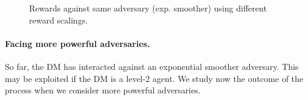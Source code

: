  \begin{figure}%
 \centering
 \caption{Rewards against same adversary (exp. smoother) using different reward scalings.}\label{fig:4C_rs}
 \end{figure}

\paragraph{Facing more powerful adversaries.}

So far, the DM has interacted against an exponential smoother
adversary. This may be exploited if the DM is a level-2 agent.
We study now the outcome of the process
when we consider more powerful adversaries.

